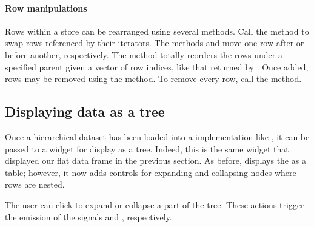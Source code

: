 \paragraph{Row manipulations}
Rows within a store can be rearranged using several methods. Call the
 method to swap rows referenced by their
iterators.  The methods  and
 move one row after or before
another, respectively.  The  method
totally reorders the rows under a specified parent given a vector of
row indices, like that returned by .
Once added, rows may be removed using the
 method. To remove every row, call the
 method.

\subsection{Displaying data as a tree}
\label{sec:RGtk2:mvc:display-tree}

Once a hierarchical dataset has been loaded into a
 implementation like , it can
be passed to a  widget for display as a
tree. Indeed, this is the same widget that displayed our flat data
frame in the previous section. As before, 
displays the  as a table; however, it now adds
controls for expanding and collapsing nodes where rows are nested.

The user can click to expand or collapse a part of the tree. These
actions trigger the emission of the signals  and
, respectively.

